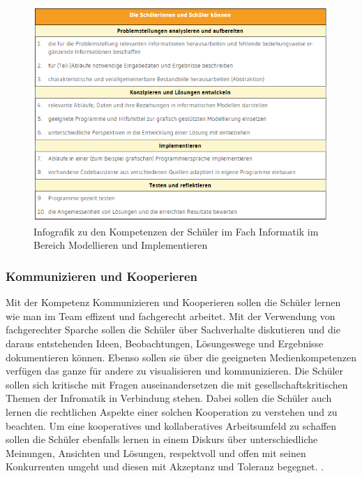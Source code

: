 \begin{figure}[H]
	\centering
	\includegraphics[width=\textwidth,height=\textheight,keepaspectratio]{images/model.png}
	\caption{Infografik zu den Kompetenzen der Schüler im Fach Informatik im Bereich Modellieren und Implementieren}
	\label{Modellieren und Implementieren Infografik}
\end{figure}

\subsubsection{Kommunizieren und Kooperieren}

Mit der Kompetenz Kommunizieren und Kooperieren  sollen die Schüler lernen wie man im Team effizent und fachgerecht arbeitet. Mit der Verwendung von fachgerechter Sparche sollen die Schüler über Sachverhalte diskutieren und die daraus entstehenden Ideen, Beobachtungen, Lösungeswege und Ergebnisse dokumentieren können. Ebenso sollen sie über die geeigneten Medienkompetenzen verfügen das ganze für andere zu visualisieren und kommunizieren. Die Schüler sollen sich kritische mit Fragen auseinandersetzen die mit gesellschaftskritischen Themen der Infromatik in Verbindung stehen. Dabei sollen die Schüler auch lernen die rechtlichen Aspekte einer solchen Kooperation zu verstehen und zu beachten. Um eine kooperatives und kollaberatives Arbeitsumfeld zu schaffen sollen die Schüler ebenfalls lernen in einem Diskurs über unterschiedliche Meinungen, Ansichten und Lösungen, respektvoll und offen mit seinen Konkurrenten umgeht und diesen mit Akzeptanz und Toleranz begegnet.
\cite{Model}.

